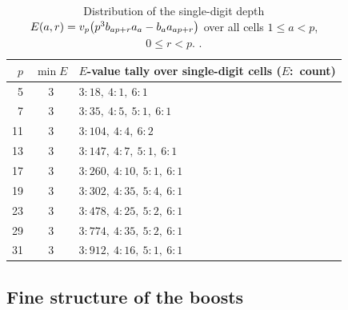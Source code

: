 \begin{table}[ht]
\centering
\caption{Distribution of the single-digit depth
$E(a,r)=v_p\bigl(p^3b_{ap+r}a_a-b_aa_{ap+r}\bigr)$ over all cells $1\le a<p$,
$0\le r<p$. .}
\label{tab:Etally}
\begin{tabular}{@{}rcl@{}}
\toprule
$p$ & $\min E$ & $E$-value tally over single-digit cells ($E$:\ count)\\
\midrule
 5 & 3 & $3{:}18,\ 4{:}1,\ 6{:}1$\\
 7 & 3 & $3{:}35,\ 4{:}5,\ 5{:}1,\ 6{:}1$\\
11 & 3 & $3{:}104,\ 4{:}4,\ 6{:}2$\\
13 & 3 & $3{:}147,\ 4{:}7,\ 5{:}1,\ 6{:}1$\\
17 & 3 & $3{:}260,\ 4{:}10,\ 5{:}1,\ 6{:}1$\\
19 & 3 & $3{:}302,\ 4{:}35,\ 5{:}4,\ 6{:}1$\\
23 & 3 & $3{:}478,\ 4{:}25,\ 5{:}2,\ 6{:}1$\\
29 & 3 & $3{:}774,\ 4{:}35,\ 5{:}2,\ 6{:}1$\\
31 & 3 & $3{:}912,\ 4{:}16,\ 5{:}1,\ 6{:}1$\\
\bottomrule
\end{tabular}
\end{table}

\subsection{Fine structure of the boosts}

